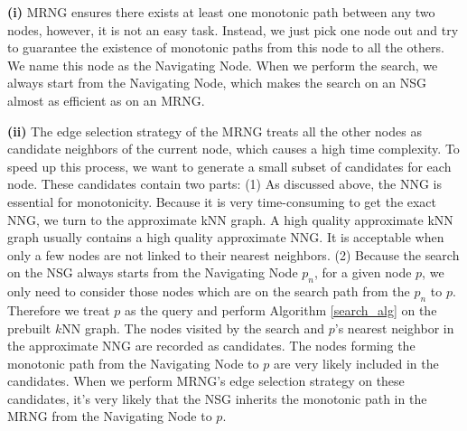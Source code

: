 \documentclass{vldb}
\begin{document}
\textbf{(i)} MRNG ensures there exists at least one monotonic path between any two nodes, however, it is not an easy task. Instead, we just pick one node out and try to guarantee the existence of monotonic paths from this node to all the others. We name this node as the Navigating Node. When we perform the search, we always start from the Navigating Node, which makes the search on an NSG almost as efficient as on an MRNG. 

\textbf{(ii)} The edge selection strategy of the MRNG treats all the other nodes as candidate neighbors of the current node, which causes a high time complexity. To speed up this process, we want to generate a small subset of candidates for each node. These candidates contain two parts: (1) As discussed above, the NNG is essential for monotonicity. Because it is very time-consuming to get the exact NNG, we turn to the approximate kNN graph. A high quality approximate kNN graph usually contains a high quality approximate NNG. It is acceptable when only a few nodes are not linked to their nearest neighbors. (2) Because the search on the NSG always starts from the Navigating Node $p_n$, for a given node $p$, we only need to consider those nodes which are on the search path from the $p_n$ to $p$. Therefore we treat $p$ as the query and perform Algorithm \ref{search_alg} on the prebuilt $k$NN graph. The nodes visited by the search and $p$'s nearest neighbor in the approximate NNG are recorded as candidates. The nodes forming the monotonic path from the Navigating Node to $p$ are very likely included in the candidates. When we perform MRNG's edge selection strategy on these candidates, it's very likely that the NSG inherits the monotonic path in the MRNG from the Navigating Node to $p$. 

\end{document}
